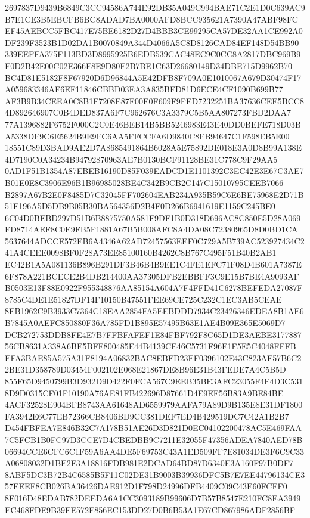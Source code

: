 \documentclass[UTF8,fontset=fandol,zihao=-4,a4paper]{ctexart}
\begin{document}
{{2697837D9439B6849C3CC94586A744E92DB35A049C994BAE71C2E1D0C639AC9B7E1CE3B5EBCFB6BC8ADAD7BA0000AFD8BCC935621A7390A47ABF98FC
EF45AEBCC5FBC417E75BE6182D27D4BBB3CE99295CA57DE32AA1CE992A0DF239F3523B1D02DA1B0070849A344D4066A5C8D8126CAD84EF148D54BB90
339EEFFA375F113BD3D8995925B6EDB539CAC48EC9C0CC8A2817DBC969B9F0D2B42E00C02E366F8E9D80F2B7BE1C63D26680149D34DBE715D9962B70
BC4D81E5182F8F67920D6D96844A5E42DFB8F709A0E1010067A679D30474F17A059683346AF6EF11846CBBD03EA3A835BFD81D6ECE4CF1090B699B77
AF3B9B34CEEA0C8B1F7208E87F00E0F609F9FED7232251BA37636CEE5BCC84D892646907C0B4DED837A6F7C962676C3A3379C5B5AA807273FBD2DAA7
77A1396882F6752F000C2C0E46BEB14B5BB5246983E43E40DD0BEFE718D03BA5338DF9C6E5624B9E9FC6AA5FFCCFA6D9840C8FB94647C1F598EB5E00
18551C89D3BAD9AE2D7A8685491864B6028A5E75892DE018E3A0D8B99A138E4D7190C0A34234B94792870963AE7B0130BCF91128BE31C778C9F29AA5
0AD1F51B1354A87EBEB16190D85F039EADCD1E1101392C3EC42E3E67C3AE7B01E0E8C3906E96B1B96985028BE4C342B9CB2C147C15010795CEEB7066
B2897A67B2E0F8485D7C32045FF702604EAB234A935B59C6E6BE75968E2D71B51F196A5D5DB9B05B30BA564356D2B4F0D266B6941619E1159C245BE0
6C04D0BEBD297D51B6B8875750A581F9DF1B0D318D696AC8C850E5D28A069FD8714AEF8C0E9FB5F1881A67B5B008AFC8A4DA08C72380965D8D0BD1CA
5637644ADCCE572EB6A4346A62AD72457563EEF0C729A5B739AC523927434C241A4CEEE0098BF0F28A73EE85100160B4262C8B767C495F51B40B2AB1
EC42B1A5A081136B896B291DF3B46B4B9EE1C4FE1EFC71F08D4B601A7387E6F878A221BCECE2B4DB214400AA37305DFB2EBBFF3C9E15B7BE4A9093AF
B0503E13F88E0922F955348876AA85154A604A7F4FFD41C6278BEFEDA27087F8785C4DE1E51827DF14F10150B47551FEE69CE725C232C1EC3AB5CEAE
8EB1962C9B3933C7364C18EAA2854FA5EEBDDD7934C23426346EDEA8B1AE6B7845A0AEFC850880F36A785FD1B895E57495B63E1AE4B09E365E5069D7
DCB272753DDB8FE4E7B7FFBFAFEF1E84FBF792F8C65D1DE3AEBE317788756CB8631A338A6BE5BFF800485E44B4139CE46C5731F96E1F5E5C4048FFFB
EFA3BAE85A575A31F8194A06832BAC8EBFD23FF0396102E43C823AF57B6C22BE31D358789D03454F002102E068E21867DE8B96E31B43FEDE7A4C5B5D
855F65D9450799B3D932D9D422F0FCA567C9EEB35BE3AFC23055F4F4D3C5318D9D0315CF01F10190A76AE81FB422696D87661D4E9EF56B83A9BE84BE
4ACF32528E904BFB8743AA61648AD6559979AAFA79A89D9B135E8E31DF1800FA3942E6C77EB72366CB8406BD9CC381DEF7ED4B429519DC7C42A1B2B7
D454FBFEA7E846B32C7A178B51AE26D3D821D0EC04102200478AC5E469FAA7C5FCB1B0FC97D3CCE7D4CBEDBB9C7211E32055F47356ADEA7840AED78B
06694CCE6CFC6C1F59A6AA4DE5F69753C43A1ED509FF7E81034DE3F6C9C33A06808032D1BE2F3A18816FDB981E2DCAD64BD87D6340E3A160F97B0DF7
8ABF5DC3B72B4C6585B5F11C02DE31B9003B39936DFC5B7E7EE44796134CE357EEEF8CB026BA36426DAE912D1F798D24996DFB4409C09C43E60FCFF0
8F016D48EDAB782DEEDA6A1CC3093189B99606D7B57B8547E210FC8EA3949EC468FDE9B39EE572F856EC153DD27D0B6B53A1E67CD867986ADF2856BF
}}
\end{document}
